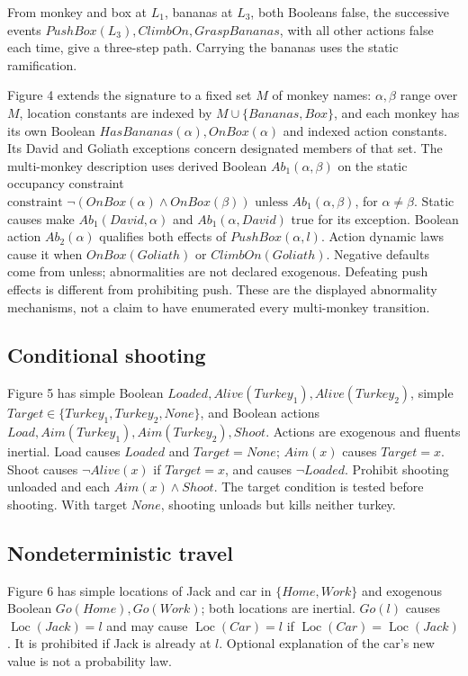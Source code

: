 From monkey and box at \(L_1\), bananas at \(L_3\), both Booleans false,
the successive events \(PushBox(L_3),ClimbOn,GraspBananas\), with all
other actions false each time, give a three-step path.
Carrying the bananas uses the static ramification.

Figure 4 extends the signature to a fixed set \(M\) of monkey names:
\(\alpha,\beta\) range over \(M\), location constants are indexed by
\(M\cup\{Bananas,Box\}\), and each monkey has its own Boolean
\(HasBananas(\alpha),OnBox(\alpha)\) and indexed action constants.
Its David and Goliath exceptions concern designated members of that set.
The multi-monkey description uses derived Boolean
\(Ab_1(\alpha,\beta)\) on the static occupancy constraint
\(\text{constraint }\neg(OnBox(\alpha)\land OnBox(\beta))
\text{ unless }Ab_1(\alpha,\beta)\), for \(\alpha\ne\beta\).
Static causes make \(Ab_1(David,\alpha)\) and \(Ab_1(\alpha,David)\)
true for its exception.
Boolean action \(Ab_2(\alpha)\) qualifies both effects of
\(PushBox(\alpha,l)\). Action dynamic laws cause it when
\(OnBox(Goliath)\) or \(ClimbOn(Goliath)\).
Negative defaults come from unless; abnormalities are not declared
exogenous. Defeating push effects is different from prohibiting push.
These are the displayed abnormality mechanisms, not a claim to have
enumerated every multi-monkey transition.

\subsection{Conditional shooting}
Figure 5 has simple Boolean \(Loaded,Alive(Turkey_1),Alive(Turkey_2)\),
simple \(Target\in\{Turkey_1,Turkey_2,None\}\), and Boolean actions
\(Load,Aim(Turkey_1),Aim(Turkey_2),Shoot\).
Actions are exogenous and fluents inertial.
Load causes \(Loaded\) and \(Target=None\); \(Aim(x)\) causes \(Target=x\).
Shoot causes \(\neg Alive(x)\) if \(Target=x\), and causes \(\neg Loaded\).
Prohibit shooting unloaded and each \(Aim(x)\land Shoot\).
The target condition is tested before shooting.
With target \(None\), shooting unloads but kills neither turkey.

\subsection{Nondeterministic travel}
Figure 6 has simple locations of Jack and car in \(\{Home,Work\}\)
and exogenous Boolean \(Go(Home),Go(Work)\); both locations are inertial.
\(Go(l)\) causes \(\operatorname{Loc}(Jack)=l\) and may cause
\(\operatorname{Loc}(Car)=l\) if
\(\operatorname{Loc}(Car)=\operatorname{Loc}(Jack)\).
It is prohibited if Jack is already at \(l\).
Optional explanation of the car's new value is not a probability law.

